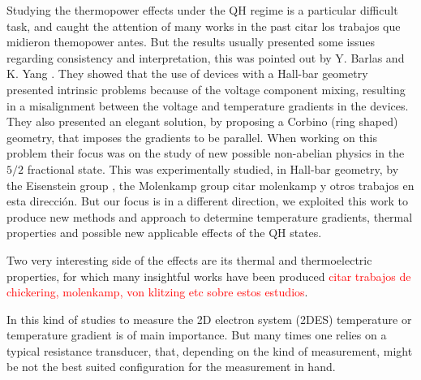 Studying the thermopower effects under the QH regime is a particular difficult task, and caught the attention of many works in the past \cite{chickering2010,chickering2010thermopower,chickering2013,kobayakawa2013diffusion} \textcolor{tmagenta}{citar los trabajos que midieron themopower antes}. But the results usually presented some issues regarding consistency and interpretation, this was pointed out by Y. Barlas and K. Yang \cite{Barlas2012}. They showed that the use of devices with a Hall-bar geometry presented intrinsic problems because of the voltage component mixing, resulting in a misalignment between the voltage and temperature gradients in the devices. They also presented an elegant solution, by proposing a Corbino (ring shaped) geometry, that imposes the gradients to be parallel. When working on this problem their focus was on the study of new possible non-abelian physics in the $ 5/2 $ fractional state. This was experimentally studied, in Hall-bar geometry, by the 
Eisenstein group \cite{chickering2010,chickering2013}, the Molenkamp group \textcolor{tmagenta}{citar molenkamp y otros trabajos en esta dirección}. But our focus is in a different direction, we exploited this work to produce new methods and approach to determine temperature gradients, thermal properties and possible new applicable effects of the QH states. 



 Two very interesting side of the effects are its thermal and thermoelectric properties, for which many insightful works have been produced \cite{chickering2010thermopower,chickering2013thermoelectric,VanHouten1992,Zalinge2003,endo2019spatial,Liu2018} \textcolor{red}{citar trabajos de chickering, molenkamp, von klitzing etc sobre estos estudios}. 

In this kind of studies to measure the 2D electron system (2DES) temperature or temperature gradient is of main importance. But many times one relies on a typical resistance transducer, that, depending on the kind of measurement, might be not the best suited configuration for the measurement in hand.


